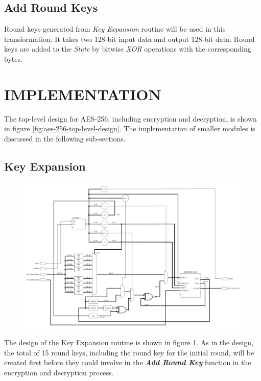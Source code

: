\documentclass[a4paper, 10pt]{article}
\begin{document}
\begin{multicols}{2}
            \subsection{Add Round Keys}

            Round keys generated from \textit{Key Expansion} routine will be used in this transformation. It takes two 128-bit input data and output 128-bit data. Round keys are added to the \textit{State} by bitwise \textit{XOR} operations with the corresponding bytes. 

        \section{IMPLEMENTATION}

	The top-level design for AES-256, including encryption and decryption, is shown in figure \ref{fig:aes-256-top-level-design}. The implementation of smaller modules is discussed in the following sub-sections.

          \subsection{Key Expansion}

	\noindent
            \begin{figure}[t]
                \centering
                \includegraphics[width=\linewidth]{KeyExpansion.png}
                \label{fig:KeyExpansion}
            \end{figure}

            The design of the Key Expansion routine is shown in figure \ref{fig:KeyExpansion}. As in the design, the total of 15 round keys, including the round key for the initial round, will be created first before they could involve in the \textbf{\textit{Add Round Key}} function in the encryption and decryption process.
            

\end{multicols}
\end{document}
